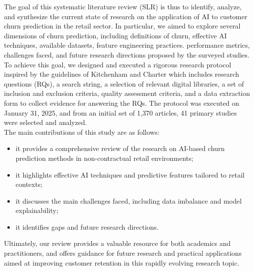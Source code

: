 \documentclass[preprint,12pt]{elsarticle}
\begin{document}
The goal of this systematic literature review (SLR) is thus to identify, analyze, and synthesize the current state of research on the application of AI to customer churn prediction in the retail sector. 
In particular, we aimed to explore several dimensions of churn prediction, including definitions of churn, effective AI techniques, available datasets, feature engineering practices. performance metrics, challenges faced, and future research directions proposed by the surveyed studies. %
To achieve this goal, we designed and executed a rigorous research protocol inspired by the guidelines of Kitchenham and Charter \cite{Kitchenham-Charters-guidelines} which includes research questions (RQs), a search string, a selection of relevant digital libraries, a set of inclusion and exclusion criteria, quality assessment criteria, and a data extraction form to collect evidence for answering the RQs. The protocol was executed on January 31, 2025, and from an initial set of 1,370 articles, 41 primary studies were selected and analyzed.  \\

\noindent The main contributions of this study are as follows: 
\begin{itemize}[itemsep=0pt]
\item it provides a comprehensive review of the research on AI-based churn prediction methods in non-contractual retail environments;
\item it highlights effective AI techniques and predictive features tailored to retail contexts;
\item it discusses the main challenges faced, including data imbalance and model explainability;
\item it identifies gaps and future research directions.
\end{itemize}



Ultimately, our review provides a valuable resource for both academics and practitioners, and offers guidance for future research and practical applications aimed at improving customer retention in this rapidly evolving research topic.
\end{document}
